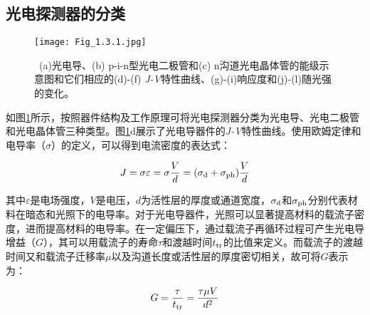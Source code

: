\documentclass[forlib]{WHUMaster}   %
\begin{document}
{\subsection{光电探测器的分类}

\begin{figure}[ht]
\centering
  \texttt{[image: Fig\_1.3.1.jpg]}
  \caption{\rm \ (a)光电导、(b) p-i-n型光电二极管和(c) n沟道光电晶体管的能级示意图和它们相应的(d)-(f) \emph{J-V}特性曲线、(g)-(i)响应度和(j)-(l)随光强的变化\cite{RN75}。}
  \label{fig:1.3.1}
\end{figure}

如图\ref{fig:1.3.1}所示，按照器件结构及工作原理可将光电探测器分类为光电导、光电二极管和光电晶体管三种类型\cite{RN75}。图\ref{fig:1.3.1}d展示了光电导器件的\emph{J-V}特性曲线。使用欧姆定律和电导率（$\sigma$）的定义，可以得到电流密度的表达式：

\begin{equation}\label{eq-1.3.6}
J = \sigma\varepsilon = \sigma\frac{V}{d} = (\sigma_{\rm{d}}+\sigma_{\rm{ph}})\frac{V}{d}
\end{equation}

其中$\varepsilon$是电场强度，$V$是电压，$d$为活性层的厚度或通道宽度，$\sigma_{\rm{d}}$和$\sigma_{\rm{ph}}$分别代表材料在暗态和光照下的电导率。对于光电导器件，光照可以显著提高材料的载流子密度，进而提高材料的电导率。在一定偏压下，通过载流子再循环过程可产生光电导增益（$G$），其可以用载流子的寿命$τ$和渡越时间$t_{\rm{tr}}$的比值来定义。而载流子的渡越时间又和载流子迁移率$\mu$以及沟道长度或活性层的厚度密切相关，故可将$G$表示为：

\begin{equation}\label{eq-1.3.7}
G =\frac{\tau}{t_{\rm{tr}}} =\frac{\tau\mu{V}}{d^2}
\end{equation}

}
\end{document}
